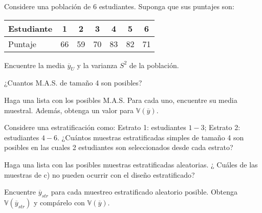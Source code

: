 \addpoints
\question Considere una población de 6 estudiantes. Suponga que sus puntajes son:
\begin{center}
\begin{tabular}{l|cccccc} 
Estudiante & 1 & 2 & 3 & 4 & 5 & 6 \\
\hline Puntaje & 66 & 59 & 70 & 83 & 82 & 71
\end{tabular}
\end{center}
\noaddpoints
\begin{parts}
\item Encuentre la media $\overline{y}_{U}$  y la varianza $S^{2}$ de la población.
\item ¿Cuantos M.A.S. de tamaño 4 son posibles?
\item Haga una lista con los posibles M.A.S. Para cada uno, encuentre su media muestral. Además, obtenga un valor para $\mathbb{V}(\overline{y})$.
\item Considere una estratificación como: Estrato 1: estudiantes $1-3$; Estrato 2: estudiantes $4-6$. ¿Cuántos muestras estratificadas simples de tamaño 4 son posibles en las cuales 2 estudiantes son seleccionados desde cada estrato?
\item Haga una lista con las posibles muestras estratificadas aleatorias. ¿ Cuáles de las muestras de c) no pueden ocurrir con el diseño estratificado?
\item Encuentre $\overline{y}_{str}$ para cada muestreo estratificado aleatorio posible. Obtenga $\mathbb{V}(\overline{y}_{str})$ y compárelo con $\mathbb{V}(\overline{y})$.
\end{parts}